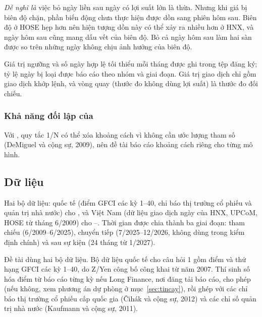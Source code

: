 \begin{delam}
\emph{Dễ nghĩ là} việc bỏ ngày liền sau ngày có lợi suất lớn là thừa. Nhưng khi giá bị biên độ chặn, phần biến động chưa thực hiện được dồn sang phiên hôm sau. Biên độ ở HOSE hẹp hơn nên hiện tượng dồn này có thể xảy ra nhiều hơn ở HNX, và ngày hôm sau cũng mang dấu vết của biên độ. Bỏ cả ngày hôm sau làm hai sàn được so trên những ngày không chịu ảnh hưởng của biên độ.
\end{delam}

Giá trị ngưỡng và số ngày hợp lệ tối thiểu mỗi tháng được ghi trong tệp đăng ký; tỷ lệ ngày bị loại được báo cáo theo nhóm và giai đoạn. Giá trị giao dịch chỉ gồm giao dịch khớp lệnh, và vòng quay (thước đo không dùng lợi suất) là thước đo đối chiếu.

\subsubsection*{Khả năng đối lập của }

Với , quy tắc 1/N có thể xóa khoảng cách vì không cần ước lượng tham số (DeMiguel và cộng sự, 2009), nên đề tài báo cáo khoảng cách riêng cho từng mô hình.

\subsection{Dữ liệu}\label{sec:dulieu}

\begin{tomtat}
Hai bộ dữ liệu: quốc tế (điểm GFCI các kỳ 1--40, chỉ báo thị trường cổ phiếu và quản trị nhà nước) cho , và Việt Nam (dữ liệu giao dịch ngày của HNX, UPCoM, HOSE từ tháng 6/2009) cho --. Thời gian được chia thành ba giai đoạn: tham chiếu (6/2009--6/2025), chuyển tiếp (7/2025--12/2026, không dùng trong kiểm định chính) và sau sự kiện (24 tháng từ 1/2027).
\end{tomtat}

Đề tài dùng hai bộ dữ liệu. Bộ dữ liệu quốc tế cho câu hỏi 1 gồm điểm và thứ hạng GFCI các kỳ 1--40, do Z/Yen công bố công khai từ năm 2007. Thí sinh số hóa điểm từ báo cáo từng kỳ nếu Long Finance, nơi đăng tải báo cáo, cho phép (nếu không, xem phương án dự phòng ở mục~\ref{sec:tincay}), rồi ghép với các chỉ báo thị trường cổ phiếu cấp quốc gia (Čihák và cộng sự, 2012) và các chỉ số quản trị nhà nước (Kaufmann và cộng sự, 2011).

